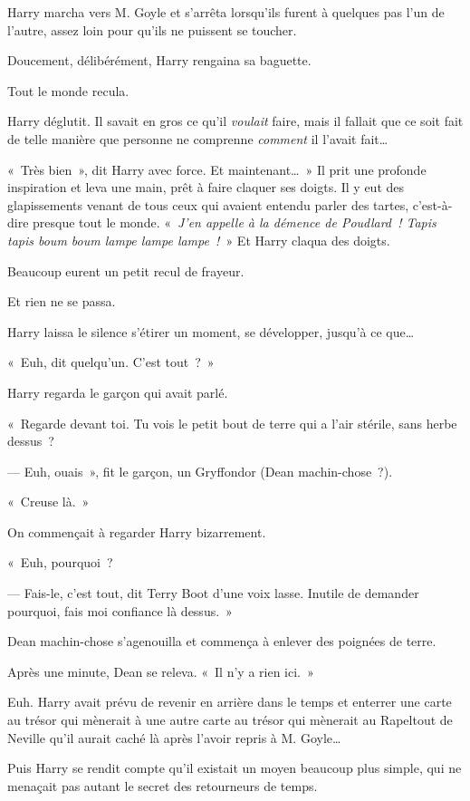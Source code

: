 Harry marcha vers M. Goyle et s'arrêta lorsqu'ils furent à quelques pas l'un de l'autre, assez loin pour qu'ils ne puissent se toucher.

Doucement, délibérément, Harry rengaina sa baguette.

Tout le monde recula.

Harry déglutit.
Il savait en gros ce qu'il \emph{voulait} faire, mais il fallait que ce soit fait de telle manière que personne ne comprenne \emph{comment} il l'avait fait…

«~Très bien~», dit Harry avec force.
Et maintenant…~»
Il prit une profonde inspiration et leva une main, prêt à faire claquer ses doigts.
Il y eut des glapissements venant de tous ceux qui avaient entendu parler des tartes, c'est-à-dire presque tout le monde.
«~\emph{J'en appelle à la démence de Poudlard~!
Tapis tapis boum boum lampe lampe lampe~!}~»
Et Harry claqua des doigts.

Beaucoup eurent un petit recul de frayeur.

Et rien ne se passa.

Harry laissa le silence s'étirer un moment, se développer, jusqu'à ce que…

«~Euh, dit quelqu'un.
C'est tout~?~»

Harry regarda le garçon qui avait parlé.

«~Regarde devant toi.
Tu vois le petit bout de terre qui a l'air stérile, sans herbe dessus~?

--- Euh, ouais~», fit le garçon, un Gryffondor (Dean machin-chose~?).

«~Creuse là.~»

On commençait à regarder Harry bizarrement.

«~Euh, pourquoi~?

--- Fais-le, c'est tout, dit Terry Boot d'une voix lasse.
Inutile de demander pourquoi, fais moi confiance là dessus.~»

Dean machin-chose s'agenouilla et commença à enlever des poignées de terre.

Après une minute, Dean se releva.
«~Il n'y a rien ici.~»

Euh. Harry avait prévu de revenir en arrière dans le temps et enterrer une carte au trésor qui mènerait à une autre carte au trésor qui mènerait au Rapeltout de Neville qu'il aurait caché là après l'avoir repris à M. Goyle…

Puis Harry se rendit compte qu'il existait un moyen beaucoup plus simple, qui ne menaçait pas autant le secret des retourneurs de temps.


